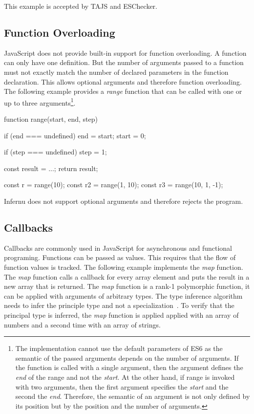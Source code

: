 This example is accepted by TAJS and ESChecker.

\subsection{Function Overloading}\label{ssec:function-overloading}
JavaScript does not provide built-in support for function overloading. A function can only have one definition. But the number of arguments passed to a function must not exactly match the number of declared parameters in the function declaration. This allows optional arguments and therefore function overloading. The following example provides a \textit{range} function that can be called with one or up to three arguments\footnote{The implementation cannot use the default parameters of ES6 as the semantic of the passed arguments depends on the number of arguments. If the function is called with a single argument, then the argument defines the \textit{end} of the range and not the \textit{start}. At the other hand, if range is invoked with two arguments, then the first argument specifies the \textit{start} and the second the \textit{end}. Therefore, the semantic of an argument is not only defined by its position but by the position and the number of arguments.}. 

\begin{javascriptcode}
function range(start, end, step) {
	if (end === undefined) {
		end = start;
		start = 0;
	}
	
	if (step === undefined) {
		step = 1;
	}
	
	const result = ...;
	return result;
}

const r = range(10);
const r2 = range(1, 10);
const r3 = range(10, 1, -1);	
\end{javascriptcode}

Infernu does not support optional arguments and therefore rejects the program. 

\subsection{Callbacks}\label{ssec:callbacks}
Callbacks are commonly used in JavaScript for asynchronous and functional programing. Functions can be passed as values. This requires that the flow of function values is tracked. The following example implements the \textit{map} function. The \textit{map} function calls a callback for every array element and puts the result in a new array that is returned. The \textit{map} function is a rank-1 polymorphic function, it can be applied with arguments of arbitrary types. The type inference algorithm needs to infer the principle type and not a specialization~\cite{Pierce2002}. To verify that the principal type is inferred, the \textit{map} function is applied applied with an array of numbers and a second time with an array of strings.

